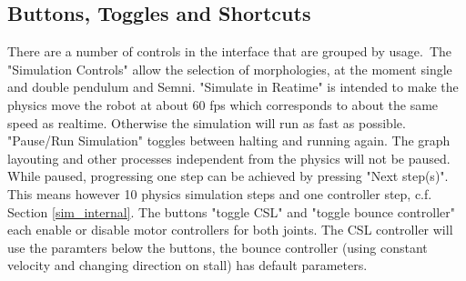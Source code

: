 \documentclass[10pt,a4paper]{article}
\begin{document}
\subsection{Buttons, Toggles and Shortcuts}

There are a number of controls in the interface that are grouped by usage.\
The "Simulation Controls" allow the selection of morphologies, at the moment single and double pendulum and Semni. "Simulate in Reatime" is intended to make the physics move the robot at about 60 fps which corresponds to about the same speed as realtime. Otherwise the simulation will run as fast as possible.
"Pause/Run Simulation" toggles between halting and running again. The graph layouting and other processes independent from the physics will not be paused. While paused, progressing one step can be achieved by pressing "Next step(s)". This means however 10 physics simulation steps and one controller step, c.f. Section \ref{sim_internal}.
The buttons "toggle CSL" and "toggle bounce controller" each enable or disable motor controllers for both joints. The CSL controller will use the paramters below the buttons, the bounce controller (using constant velocity and changing direction on stall) has default parameters.
\end{document}
